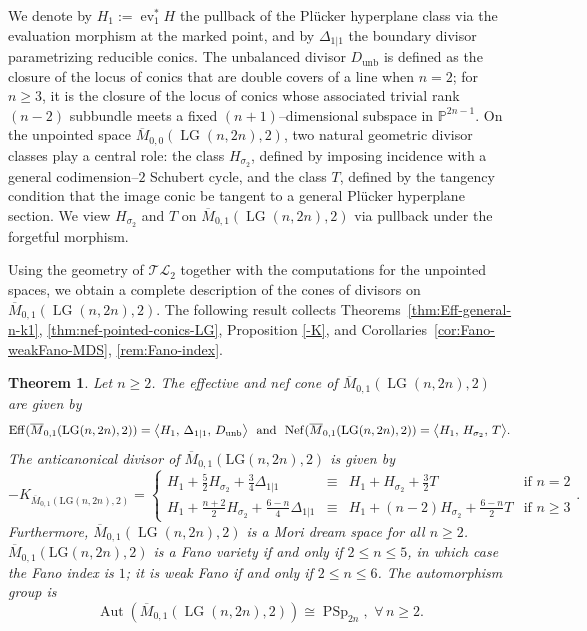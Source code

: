 \documentclass[10pt]{amsart}
\theoremstyle{definition}
\newcommand{\Aut}{\operatorname{Aut}}
\newcommand{\LG}{\operatorname{LG}}
\DeclareMathOperator{\PSp}{PSp}
\newcommand{\ev}{\operatorname{ev}}
\newcommand{\TL}{\mathcal{TL}}
\DeclareMathOperator{\unb}{unb}
\newcommand{\PP}{\mathbb{P}}
\theoremstyle{plain} %
\newtheorem{theoremABC}{Theorem}
\begin{document}
We denote by $H_1:=\ev_1^*H$ the pullback of the Pl\"ucker hyperplane class via the evaluation morphism at the marked point, and by $\Delta_{1|1}$ the boundary divisor parametrizing reducible conics. The unbalanced divisor $D_{\unb}$ is defined as the closure of the locus of conics that are double covers of a line when $n=2$; for $n\ge 3$, it is the closure of the locus of conics whose associated trivial rank $(n-2)$ subbundle meets a fixed $(n+1)$--dimensional subspace in $\PP^{2n-1}$.
On the unpointed space $\overline{M}_{0,0}(\LG(n,2n),2)$, two natural geometric divisor classes play a central role:
the class $H_{\sigma_2}$, defined by imposing incidence with a general codimension--$2$ Schubert cycle, and the class $T$, defined by the tangency condition that the image conic be tangent to a general Pl\"ucker hyperplane section. We view $H_{\sigma_2}$ and $T$ on $\overline{M}_{0,1}(\LG(n,2n),2)$ via pullback under the forgetful morphism. 

Using the geometry of $\TL_2$ together with the computations for the unpointed spaces, we obtain a complete description of the cones of divisors on $\overline{M}_{0,1}(\LG(n,2n),2)$. The following result collects Theorems~\ref{thm:Eff-general-n-k1}, \ref{thm:nef-pointed-conics-LG}, Proposition \ref{-K}, and Corollaries~\ref{cor:Fano-weakFano-MDS}, \ref{rem:Fano-index}.
\begin{theoremABC}\label{thm:C}
Let $n\ge 2$. The effective and nef cone of $\overline{M}_{0,1}(\LG(n,2n),2)$ are given by
\[
\operatorname{Eff}(\overline{M}_{0,1}(\LG(n,2n),2))
=\bigl\langle H_1,\, \Delta_{1|1},\,D_{\unb}\bigr\rangle\,\,\,\,{\rm and}\,\,\, 
\operatorname{Nef}(\overline{M}_{0,1}(\LG(n,2n),2))
=\bigl\langle H_1,\, H_{\sigma_2},\, T\bigr\rangle.
\]
The anticanonical divisor of $\overline{M}_{0,1}(\mathrm{LG}(n,2n),2)$ is given by 
$$
-K_{\overline{M}_{0,1}(\mathrm{LG}(n,2n),2)} = \left\lbrace
\begin{array}{lcll}
H_1 + \frac{5}{2}H_{\sigma_2} + \frac{3}{4}\Delta_{1|1} & \equiv & H_1 + H_{\sigma_2} + \frac{3}{2}T & \text{if } n = 2\\ 
H_1 + \frac{n+2}{2}H_{\sigma_2} + \frac{6-n}{4}\Delta_{1|1} & \equiv & H_1+(n-2)H_{\sigma_2}+\frac{6-n}{2}T & \text{if } n \geq 3
\end{array}\right.. 
$$
Furthermore, $\overline{M}_{0,1}(\LG(n,2n),2)$ is a Mori dream space for all $n\ge 2$. $\overline{M}_{0,1}(\mathrm{LG}(n,2n),2)$ is a Fano variety if and only if $2\le n\le 5$, in which case the Fano index is $1$; it is weak Fano if and only if $2\leq n\leq6$. The automorphism group is
\[
\Aut(\overline{M}_{0,1}(\LG(n,2n),2))\cong\PSp_{2n},\,\,\forall\,n\ge 2.
\]
\end{theoremABC}
\end{document}

